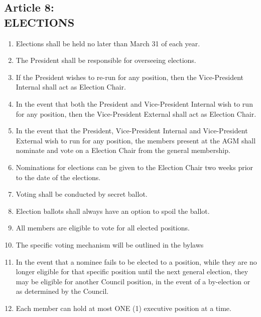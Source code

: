 \documentclass[]{report}
\begin{document}
\clearpage
\begin{center}
	\section*{Article 8:\\ELECTIONS}
	\vspace{12px}
\end{center}
\label{elections}
	\renewcommand{\theenumi}{\Alph{enumi}}
	\begin{enumerate}
	
		\item Elections shall be held no later than March 31 of each year.
		\item The President shall be responsible for overseeing elections.
		\item If the President wishes to re-run for any position, then the Vice-President Internal shall act as Election Chair. 
		\item In the event that both the President and Vice-President Internal wish to run for any position, then the Vice-President External shall act as Election Chair. 
		\item In the event that the President, Vice-President Internal and Vice-President External wish to run for any position, the members present at the AGM shall nominate and vote on a Election Chair from the general membership.
		\item Nominations for elections can be given to the Election Chair two weeks prior to the date of the elections. 
		\item Voting shall be conducted by secret ballot.
		\item Election ballots shall always have an option to spoil the ballot.
		\item All members are eligible to vote for all elected positions.
		\item The specific voting mechanism will be outlined in the bylaws
		\item In the event that a nominee fails to be elected to a position, while they are no longer eligible for that specific position until the next general election, they may be eligible for another Council position, in the event of a by-election or as determined by the Council.
		\item Each member can hold at most ONE (1) executive position at a time.
	
	\end{enumerate}
\end{document}
